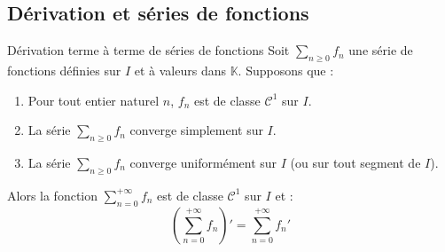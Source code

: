 \documentclass[a4paper,10pt]{report}
\begin{document}
\begin{Demonstration}{} 

\vspace{11cm}
\end{Demonstration}

\subsection{Dérivation et séries de fonctions}

\begin{Theoreme}{Dérivation terme à terme de séries de fonctions}
Soit $\sum_{n \geq 0} f_n$ une série de fonctions définies sur $I$ et à valeurs dans $\mathbb{K}$. Supposons que :

\begin{enumerate}
\item Pour tout entier naturel $n$, $f_n$ est de classe $\mathcal{C}^1$ sur $I$.
\item La série $\sum_{n \geq 0} f_n$ converge simplement sur $I$.
\item La série $\sum_{n \geq 0} f_n$ converge uniformément sur $I$ (ou sur tout segment de $I$).
\end{enumerate}
Alors la fonction $\sum_{n=0}^{+ \infty} f_n$ est de classe $\mathcal{C}^1$ sur $I$ et :
$$ \left( \sum_{n=0}^{+ \infty} f_n \right)' = \sum_{n=0}^{+ \infty} f_n'$$
\end{Theoreme}
\end{document}
